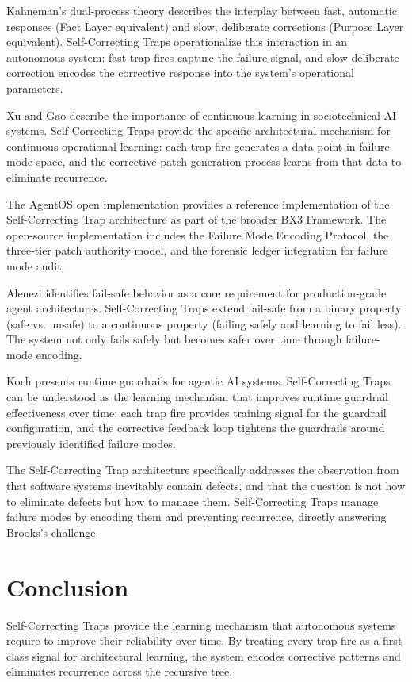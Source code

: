 \documentclass[12pt]{article}
\begin{document}
Kahneman's dual-process theory \cite{kahneman2011} describes the interplay between fast, automatic responses (Fact Layer equivalent) and slow, deliberate corrections (Purpose Layer equivalent). Self-Correcting Traps operationalize this interaction in an autonomous system: fast trap fires capture the failure signal, and slow deliberate correction encodes the corrective response into the system's operational parameters.

Xu and Gao \cite{xu2024} describe the importance of continuous learning in sociotechnical AI systems. Self-Correcting Traps provide the specific architectural mechanism for continuous operational learning: each trap fire generates a data point in failure mode space, and the corrective patch generation process learns from that data to eliminate recurrence.

The AgentOS open implementation \cite{agentos2026} provides a reference implementation of the Self-Correcting Trap architecture as part of the broader BX3 Framework. The open-source implementation includes the Failure Mode Encoding Protocol, the three-tier patch authority model, and the forensic ledger integration for failure mode audit.

Alenezi \cite{alenezi2026} identifies fail-safe behavior as a core requirement for production-grade agent architectures. Self-Correcting Traps extend fail-safe from a binary property (safe vs. unsafe) to a continuous property (failing safely and learning to fail less). The system not only fails safely but becomes safer over time through failure-mode encoding.

Koch \cite{koch2026} presents runtime guardrails for agentic AI systems. Self-Correcting Traps can be understood as the learning mechanism that improves runtime guardrail effectiveness over time: each trap fire provides training signal for the guardrail configuration, and the corrective feedback loop tightens the guardrails around previously identified failure modes.

The Self-Correcting Trap architecture specifically addresses the observation from \cite{brooks1987} that software systems inevitably contain defects, and that the question is not how to eliminate defects but how to manage them. Self-Correcting Traps manage failure modes by encoding them and preventing recurrence, directly answering Brooks's challenge.

\section{Conclusion}
Self-Correcting Traps provide the learning mechanism that autonomous systems require to improve their reliability over time. By treating every trap fire as a first-class signal for architectural learning, the system encodes corrective patterns and eliminates recurrence across the recursive tree.
\end{document}
